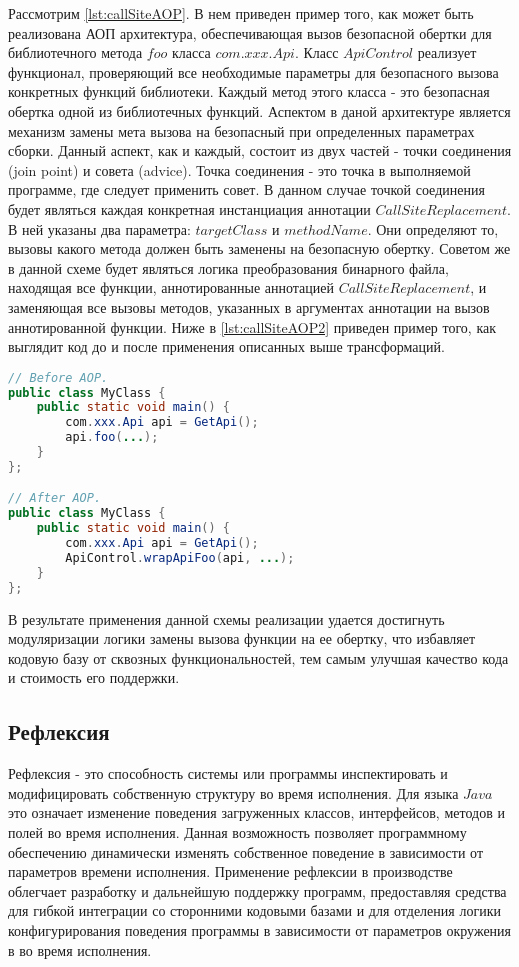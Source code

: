 Рассмотрим \autoref{lst:callSiteAOP}. В нем приведен пример того, как может быть реализована АОП архитектура, обеспечивающая вызов безопасной обертки для библиотечного метода $foo$ класса $com.xxx.Api$. Класс $ApiControl$ реализует функционал, проверяющий все необходимые параметры для безопасного вызова конкретных функций библиотеки. Каждый метод этого класса - это безопасная обертка одной из библиотечных функций. Аспектом в даной архитектуре является механизм замены мета вызова на безопасный при определенных параметрах сборки. Данный аспект, как и каждый, состоит из двух частей - точки соединения (join point) и совета (advice). Точка соединения - это точка в выполняемой программе, где следует применить совет. В данном случае точкой соединения будет являться каждая конкретная инстанциация аннотации $CallSiteReplacement$. В ней указаны два параметра: $targetClass$ и $methodName$. Они определяют то, вызовы какого метода должен быть заменены на безопасную обертку. Советом же в данной схеме будет являться логика преобразования бинарного файла, находящая все функции, аннотированные аннотацией $CallSiteReplacement$, и заменяющая все вызовы методов, указанных в аргументах аннотации на вызов аннотированной функции. Ниже в  \autoref{lst:callSiteAOP2} приведен пример того, как выглядит код до и после применения описанных выше трансформаций.

\begin{lstlisting}[language=Java, caption=Демонстрация работы аспекта, label=lst:callSiteAOP2]
// Before AOP.
public class MyClass {
    public static void main() {
        com.xxx.Api api = GetApi();
        api.foo(...);
    }
};

// After AOP.
public class MyClass {
    public static void main() {
        com.xxx.Api api = GetApi();
        ApiControl.wrapApiFoo(api, ...);
    }
};
\end{lstlisting}

В результате применения данной схемы реализации удается достигнуть модуляризации логики замены вызова функции на ее обертку, что избавляет кодовую базу от сквозных функциональностей, тем самым улучшая качество кода и стоимость его поддержки.

\subsection{Рефлексия}

Рефлексия - это способность системы или программы инспектировать и модифицировать собственную структуру во время исполнения. Для языка $Java$ это означает изменение поведения загруженных классов, интерфейсов, методов и полей во время исполнения. Данная возможность позволяет программному обеспечению динамически изменять собственное поведение в зависимости от параметров времени исполнения. Применение рефлексии в производстве облегчает разработку и дальнейшую поддержку программ, предоставляя средства для гибкой интеграции со сторонними кодовыми базами и для отделения логики конфигурирования поведения программы в зависимости от параметров окружения в во время исполнения.

